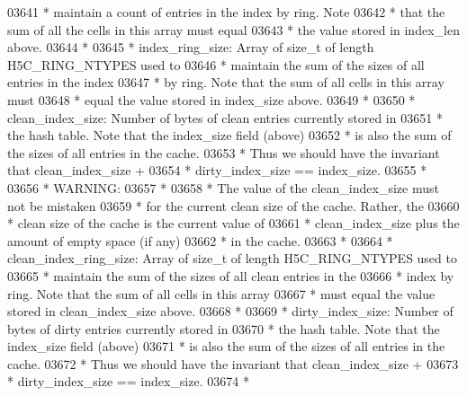 \begin{DoxyCode}
03641 \textcolor{comment}{ *      maintain a count of entries in the index by ring.  Note }
03642 \textcolor{comment}{ *      that the sum of all the cells in this array must equal }
03643 \textcolor{comment}{ *      the value stored in index\_len above.}
03644 \textcolor{comment}{ *}
03645 \textcolor{comment}{ * index\_ring\_size: Array of size\_t of length H5C\_RING\_NTYPES used to }
03646 \textcolor{comment}{ *      maintain the sum of the sizes of all entries in the index}
03647 \textcolor{comment}{ *      by ring.  Note that the sum of all cells in this array must}
03648 \textcolor{comment}{ *      equal the value stored in index\_size above.}
03649 \textcolor{comment}{ *}
03650 \textcolor{comment}{ * clean\_index\_size: Number of bytes of clean entries currently stored in}
03651 \textcolor{comment}{ *      the hash table.  Note that the index\_size field (above)}
03652 \textcolor{comment}{ *      is also the sum of the sizes of all entries in the cache.}
03653 \textcolor{comment}{ *      Thus we should have the invariant that clean\_index\_size +}
03654 \textcolor{comment}{ *      dirty\_index\_size == index\_size.}
03655 \textcolor{comment}{ *}
03656 \textcolor{comment}{ *      WARNING:}
03657 \textcolor{comment}{ *}
03658 \textcolor{comment}{ *         The value of the clean\_index\_size must not be mistaken}
03659 \textcolor{comment}{ *         for the current clean size of the cache.  Rather, the}
03660 \textcolor{comment}{ *         clean size of the cache is the current value of}
03661 \textcolor{comment}{ *         clean\_index\_size plus the amount of empty space (if any)}
03662 \textcolor{comment}{ *                 in the cache.}
03663 \textcolor{comment}{ *}
03664 \textcolor{comment}{ * clean\_index\_ring\_size: Array of size\_t of length H5C\_RING\_NTYPES used to}
03665 \textcolor{comment}{ *      maintain the sum of the sizes of all clean entries in the }
03666 \textcolor{comment}{ *      index by ring.  Note that the sum of all cells in this array }
03667 \textcolor{comment}{ *      must equal the value stored in clean\_index\_size above.}
03668 \textcolor{comment}{ *}
03669 \textcolor{comment}{ * dirty\_index\_size: Number of bytes of dirty entries currently stored in}
03670 \textcolor{comment}{ *      the hash table.  Note that the index\_size field (above)}
03671 \textcolor{comment}{ *      is also the sum of the sizes of all entries in the cache.}
03672 \textcolor{comment}{ *      Thus we should have the invariant that clean\_index\_size +}
03673 \textcolor{comment}{ *      dirty\_index\_size == index\_size.}
03674 \textcolor{comment}{ *}

\end{DoxyCode}

